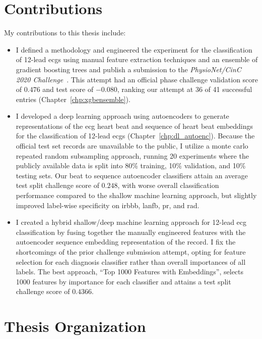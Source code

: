 \documentclass[\main/thesis.tex]{subfiles}
\begin{document}
\section{Contributions}

My contributions to this thesis include:
\begin{itemize}
    \item I defined a methodology and engineered the experiment for the classification of 12-lead \gls{ecg}s using manual feature extraction techniques and an ensemble of gradient boosting trees and publish a submission to the \emph{PhysioNet/CinC 2020 Challenge}~\cite{physionet_challenge_2020}.
    This attempt had an official phase challenge validation score of $0.476$ and test score of $-0.080$, ranking our attempt at 36 of 41 successful entries (Chapter~\ref{chp:xgbensemble}).
    \item I developed a deep learning approach using autoencoders to generate representations of the \gls{ecg} heart beat and sequence of heart beat embeddings for the classification of 12-lead \gls{ecg}s (Chapter~\ref{chp:dl_autoenc}).
    Because the official test set records are unavailable to the public, I utilize a monte carlo repeated random subsampling approach, running 20 experiments where the publicly available data is split into 80\% training, 10\% validation, and 10\% testing sets.
    Our beat to sequence autoencoder classifiers attain an average test split challenge score of $0.248$, with worse overall classification performance compared to the shallow machine learning approach, but slightly improved label-wise specificity on \acrlong{irbbb}, \acrlong{lanfb}, \acrlong{pr}, and \acrlong{rad}.
    \item I created a hybrid shallow/deep machine learning approach for 12-lead \gls{ecg} classification by fusing together the manually engineered features with the autoencoder sequence embedding representation of the record.
    I fix the shortcomings of the prior challenge submission attempt, opting for feature selection for each diagnosis classifier rather than overall importances of all labels.
    The best approach, ``Top 1000 Features with Embeddings'', selects 1000 features by importance for each classifier and attains a test split challenge score of $0.4366$.
\end{itemize}

\section{Thesis Organization}
\end{document}
